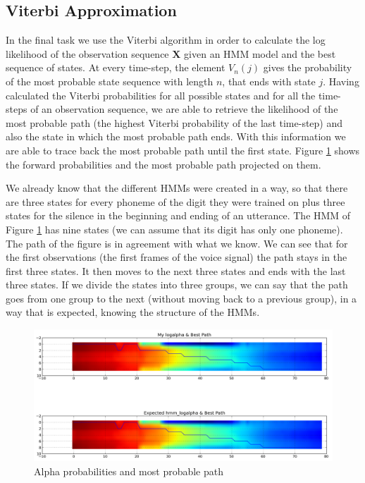 \documentclass[12pt,a4paper,oneside]{article}
\begin{document}
\subsection{Viterbi Approximation}
In the final task we use the Viterbi algorithm in order to calculate the log likelihood of the observation sequence $\mathbf{X}$ given an HMM model and the best
sequence of states. At every time-step, the element $V_n(j)$ gives the probability of the most probable state sequence with length $n$, that ends with state $j$. Having calculated the Viterbi probabilities for all possible states and for all the time-steps of an observation sequence, we are able to retrieve the likelihood of the most probable path (the highest Viterbi probability of the last time-step) and also the state in which the most probable path ends. With this information we are able to trace back the most probable path until the first state. Figure \ref{fig:logalpha} shows the forward probabilities and the most probable path projected on them.

We already know that the different HMMs were created in a way, so that there are three states for every phoneme of the digit they were trained on plus three states for the silence in the beginning and ending of an utterance. The HMM of Figure \ref{fig:logalpha} has nine states (we can assume that its digit has only one phoneme). The path of the figure is in agreement with what we know. We can see that for the first observations (the first frames of the voice signal) the path stays in the first three states. It then moves to the next three states and ends with the last three states. If we divide the states into three groups, we can say that the path goes from one group to the next (without moving back to a previous group), in a way that is expected, knowing the structure of the HMMs.

\begin{figure}[h]
\includegraphics[scale=0.4]{../logalpha.png}
\caption{Alpha probabilities and most probable path}
\label{fig:logalpha}
\end{figure}
\end{document}

